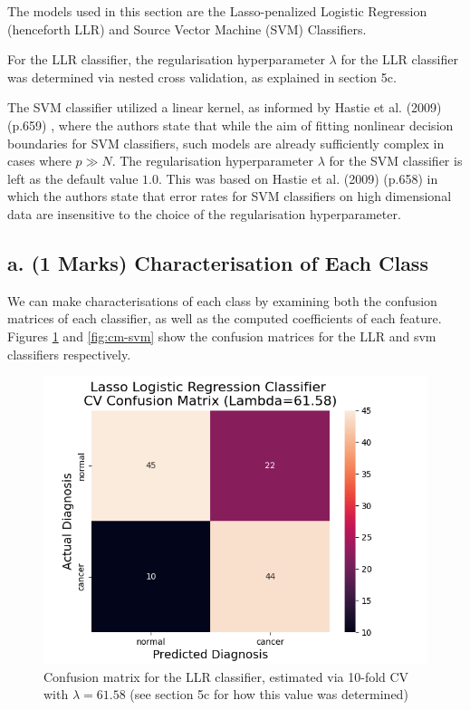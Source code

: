 \documentclass[twocolumn]{article}
\begin{document}
The models used in this section are the Lasso-penalized Logistic Regression (henceforth LLR) and Source Vector Machine (SVM) Classifiers. 

For the LLR classifier, the regularisation hyperparameter $\lambda$ for the LLR classifier was determined via nested cross validation, as explained in section 5c.

The SVM classifier utilized a linear kernel, as informed by Hastie et al. (2009) (p.659) \cite{HastieTrevor2009EoSL}, where the authors state that while the aim of fitting nonlinear decision boundaries for SVM classifiers, such models are already sufficiently complex in cases where $p \gg N$. The regularisation hyperparameter $\lambda$ for the SVM classifier is left as the default value $1.0$. This was based on Hastie et al. (2009) (p.658) \cite{HastieTrevor2009EoSL} in which the authors state that error rates for SVM classifiers on high dimensional data are insensitive to the choice of the regularisation hyperparameter. 

\subsection{a. (1 Marks) Characterisation of Each Class}

We can make characterisations of each class by examining both the confusion matrices of each classifier, as well as the computed coefficients of each feature. Figures \ref{fig:cm-lasso} and \ref{fig:cm-svm} show the confusion matrices for the LLR and svm classifiers respectively.

\begin{figure}[H]
    \centering
    \includegraphics[width=\linewidth]{figures/Lasso_Logistic_Regression_Classifier_CV_Confusion_Matrix.png}
    \caption{Confusion matrix for the LLR classifier, estimated via 10-fold CV with $\lambda = 61.58$ (see section 5c for how this value was determined)}
    \label{fig:cm-lasso}
\end{figure}
\end{document}
